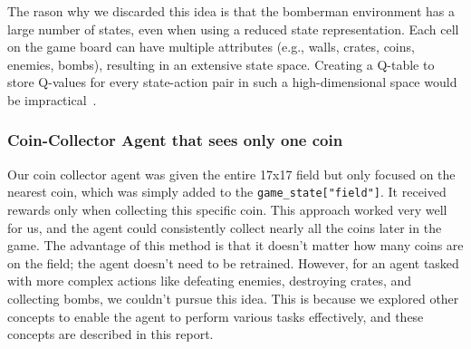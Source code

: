 The rason why we discarded this idea is that the bomberman environment has a large number of states, even when using a reduced state representation. 
Each cell on the game board can have multiple attributes (e.g., walls, crates, coins, enemies, bombs), resulting in an extensive state space. 
Creating a Q-table to store Q-values for every state-action pair in such a high-dimensional space would be impractical~\cite{Onl:qtabledis}.


\subsubsection{Coin-Collector Agent that sees only one coin}

Our coin collector agent was given the entire 17x17 field but only focused on the nearest coin, which was simply added to the \verb|game_state["field"]|. 
It received rewards only when collecting this specific coin. This approach worked very well for us, and the agent could consistently collect nearly 
all the coins later in the game. The advantage of this method is that it doesn't matter how many coins are on the field; the agent doesn't need to be 
retrained. However, for an agent tasked with more complex actions like defeating enemies, destroying crates, and collecting bombs, we couldn't 
pursue this idea. This is because we explored other concepts to enable the agent to perform various tasks effectively, and these concepts are described in this report.